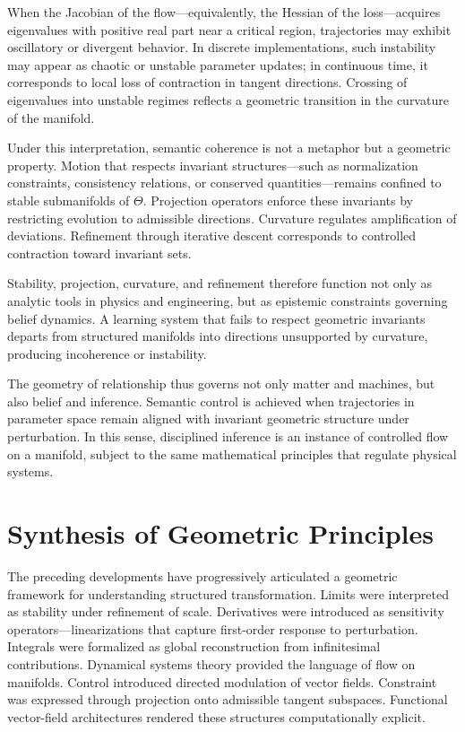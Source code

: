 \documentclass[12pt]{book}
\begin{document}
When the Jacobian of the flow---equivalently, the Hessian of the loss---acquires eigenvalues with positive real part near a critical region, trajectories may exhibit oscillatory or divergent behavior. In discrete implementations, such instability may appear as chaotic or unstable parameter updates; in continuous time, it corresponds to local loss of contraction in tangent directions. Crossing of eigenvalues into unstable regimes reflects a geometric transition in the curvature of the manifold.

Under this interpretation, semantic coherence is not a metaphor but a geometric property. Motion that respects invariant structures---such as normalization constraints, consistency relations, or conserved quantities---remains confined to stable submanifolds of $\Theta$. Projection operators enforce these invariants by restricting evolution to admissible directions. Curvature regulates amplification of deviations. Refinement through iterative descent corresponds to controlled contraction toward invariant sets.

Stability, projection, curvature, and refinement therefore function not only as analytic tools in physics and engineering, but as epistemic constraints governing belief dynamics. A learning system that fails to respect geometric invariants departs from structured manifolds into directions unsupported by curvature, producing incoherence or instability.

The geometry of relationship thus governs not only matter and machines, but also belief and inference. Semantic control is achieved when trajectories in parameter space remain aligned with invariant geometric structure under perturbation. In this sense, disciplined inference is an instance of controlled flow on a manifold, subject to the same mathematical principles that regulate physical systems.

\section{Synthesis of Geometric Principles}

The preceding developments have progressively articulated a geometric framework for understanding structured transformation. Limits were interpreted as stability under refinement of scale. Derivatives were introduced as sensitivity operators---linearizations that capture first-order response to perturbation. Integrals were formalized as global reconstruction from infinitesimal contributions. Dynamical systems theory provided the language of flow on manifolds. Control introduced directed modulation of vector fields. Constraint was expressed through projection onto admissible tangent subspaces. Functional vector-field architectures rendered these structures computationally explicit.
\end{document}

